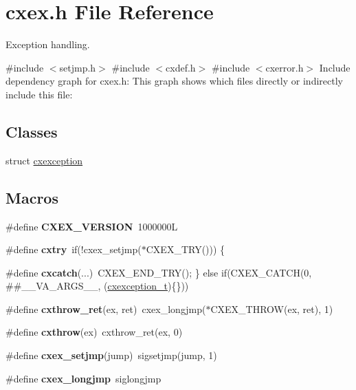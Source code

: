 \hypertarget{a00011}{}\section{cxex.\+h File Reference}
\label{a00011}


Exception handling.  


{\ttfamily \#include $<$setjmp.\+h$>$}\newline
{\ttfamily \#include $<$cxdef.\+h$>$}\newline
{\ttfamily \#include $<$cxerror.\+h$>$}\newline
Include dependency graph for cxex.\+h\+:
This graph shows which files directly or indirectly include this file\+:
\subsection*{Classes}
\begin{DoxyCompactItemize}
\item 
struct \hyperlink{a00048}{cxexception}
\end{DoxyCompactItemize}
\subsection*{Macros}
\begin{DoxyCompactItemize}
\item 
\mbox{\label{a00011_a099d212cb0554607ddc5f97f459108f8}} 
\#define {\bfseries C\+X\+E\+X\+\_\+\+V\+E\+R\+S\+I\+ON}~1000000L
\item 
\mbox{\label{a00011_a07394dfadb1e836bb044fd133a0b5fdc}} 
\#define {\bfseries cxtry}~if(!cxex\+\_\+setjmp($\ast$C\+X\+E\+X\+\_\+\+T\+RY())) \{
\item 
\mbox{\label{a00011_a5d2ea9622f3bd15d8e8489663e04b11b}} 
\#define {\bfseries cxcatch}(...)~C\+X\+E\+X\+\_\+\+E\+N\+D\+\_\+\+T\+RY(); \} else if(C\+X\+E\+X\+\_\+\+C\+A\+T\+CH(0, \#\#\+\_\+\+\_\+\+V\+A\+\_\+\+A\+R\+G\+S\+\_\+\+\_\+, (\hyperlink{a00048}{cxexception\+\_\+t})\{\}))
\item 
\mbox{\label{a00011_a6eb910a21c7df5cfaef2b0283101205d}} 
\#define {\bfseries cxthrow\+\_\+ret}(ex,  ret)~cxex\+\_\+longjmp($\ast$C\+X\+E\+X\+\_\+\+T\+H\+R\+OW(ex, ret), 1)
\item 
\mbox{\label{a00011_a868460d46c56b694c6aa3f18464c9c4d}} 
\#define {\bfseries cxthrow}(ex)~cxthrow\+\_\+ret(ex, 0)
\item 
\mbox{\label{a00011_aaac72ecb8338617ac54c2e50334d92ef}} 
\#define {\bfseries cxex\+\_\+setjmp}(jump)~sigsetjmp(jump, 1)
\item 
\mbox{\label{a00011_a4ec477263777d3fa887e5451b3ec14f5}} 
\#define {\bfseries cxex\+\_\+longjmp}~siglongjmp
\end{DoxyCompactItemize}
